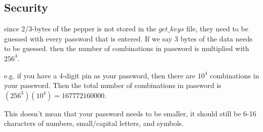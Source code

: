 \documentclass[a4paper,12pt]{article}
\begin{document}
\subsection{Security}
 
since 2/3-bytes of the pepper is not stored in the $get\_keys$ file, they need to be guessed with every password that is entered. If we say 3 bytes of the data needs to be guessed. then the number of combinations in password is multiplied with $256^3$.

e.g. if you have a 4-digit pin as your password, then there are $10^4$ combinations in your password. Then the total number of combinations in password is $(256^3)(10^4) = 167772160000$.

This doesn't mean that your password needs to be smaller, it should still be 6-16 characters of numbers, small/capital letters, and symbols.
\end{document}

